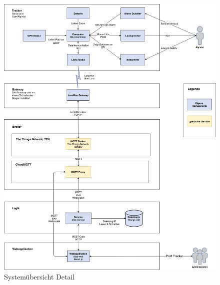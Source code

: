 \documentclass[11pt,english,german]{report}
\theoremstyle{definition}
\begin{document}
\newpage
\begin{figure}[H]
	\centering
	\includegraphics[width=\textwidth]{img/system/ATAS_SystemOverview_Detail_BA.png}
	\caption[Systemübersicht Detail]
	{Systemübersicht Detail}
\end{figure}
\newpage
\end{document}
